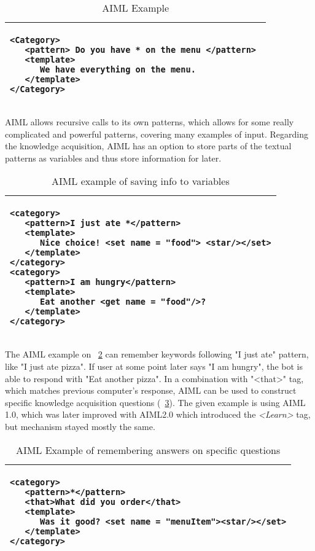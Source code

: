\begin{table}[htb]
\caption{AIML Example}
\label{tab:aiml_example}
\centering
\begin{tabular}{l}
\hline
\lstset{language=XML,breaklines=true}
\begin{lstlisting}
<Category> 
   <pattern> Do you have * on the menu </pattern> 
   <template>
      We have everything on the menu.
   </template> 
</Category>
\end{lstlisting}  \\
\hline
\end{tabular}
\end{table}

AIML allows recursive calls to its own patterns, which allows for some really complicated
and powerful patterns, covering many examples of input. Regarding the knowledge acquisition,
AIML has an option to store parts of the textual patterns as variables and thus store 
information for later. 

\begin{table}[htb]
	\caption{AIML example of saving info to variables}
	\label{tab:aiml_ka1}
	\centering
	\begin{tabular}{l}
		\hline
		\lstset{language=XML,breaklines=true}
		\begin{lstlisting}
<category>
   <pattern>I just ate *</pattern>
   <template>
      Nice choice! <set name = "food"> <star/></set>
   </template>  
</category>  
<category>
   <pattern>I am hungry</pattern>
   <template>
      Eat another <get name = "food"/>?
   </template>  
</category> 
		\end{lstlisting}  \\
		\hline
	\end{tabular}
\end{table}

The AIML example on \tablename~\ref{tab:aiml_ka1} can remember keywords
following "I just ate" pattern, like "I just ate pizza". If user at some point 
later says "I am hungry", the bot is able to respond with "Eat another pizza". 
In a combination with "<that>" tag, which matches previous computer's response, 
AIML can be used to construct specific knowledge acquisition questions 
(\tablename~\ref{tab:aiml_ka2}).  The given example is using AIML 1.0, which
was later improved with AIML2.0\parencite{Wallace2013} which introduced the
\emph{<Learn>} tag, but mechanism stayed mostly the same.

\begin{table}[htb]
	\caption{AIML Example of remembering answers on specific questions}
	\label{tab:aiml_ka2}
	\centering
	\begin{tabular}{l}
		\hline
		\lstset{language=XML,breaklines=true}
		\begin{lstlisting}
<category>
   <pattern>*</pattern>
   <that>What did you order</that>
   <template> 
      Was it good? <set name = "menuItem"><star/></set>
   </template>  
</category>  
		\end{lstlisting}  \\
		\hline
	\end{tabular}
\end{table}

